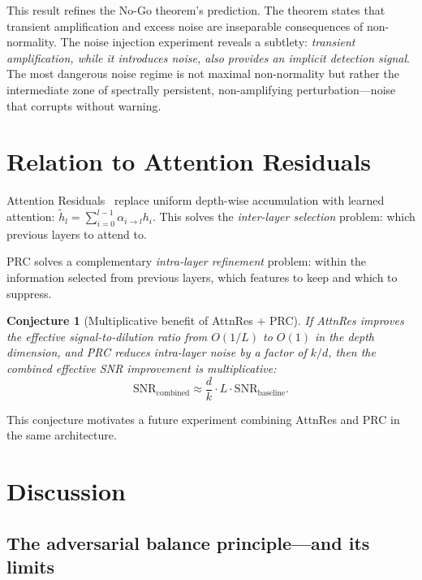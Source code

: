 \documentclass[11pt,a4paper]{article}
\newtheorem{conjecture}[theorem]{Conjecture}
\theoremstyle{definition}
\begin{document}
This result refines the No-Go theorem's prediction. The theorem
states that transient amplification and excess noise are inseparable
consequences of non-normality. The noise injection experiment reveals
a subtlety: \emph{transient amplification, while it introduces noise,
also provides an implicit detection signal}. The most dangerous noise
regime is not maximal non-normality but rather the intermediate zone
of spectrally persistent, non-amplifying perturbation---noise that
corrupts without warning.

\section{Relation to Attention Residuals}
\label{sec:attnres}

Attention Residuals~\cite{chen2026attnres} replace uniform depth-wise
accumulation with learned attention:
$\tilde{h}_l = \sum_{i=0}^{l-1} \alpha_{i \to l} h_i$.
This solves the \emph{inter-layer selection} problem: which previous layers
to attend to.

PRC solves a complementary \emph{intra-layer refinement} problem: within
the information selected from previous layers, which features to keep and
which to suppress.

\begin{conjecture}[Multiplicative benefit of AttnRes $+$ PRC]
\label{conj:combination}
If AttnRes improves the effective signal-to-dilution ratio from $O(1/L)$
to $O(1)$ in the depth dimension, and PRC reduces intra-layer noise by a
factor of $k/d$, then the combined effective SNR improvement is multiplicative:
\[
  \mathrm{SNR}_{\mathrm{combined}} \approx
  \frac{d}{k} \cdot L \cdot \mathrm{SNR}_{\mathrm{baseline}}.
\]
\end{conjecture}

This conjecture motivates a future experiment combining AttnRes and PRC
in the same architecture.

\section{Discussion}
\label{sec:discussion}

\subsection{The adversarial balance principle---and its limits}
\end{document}
